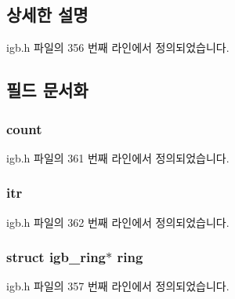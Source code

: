 \subsection{상세한 설명}


igb.\+h 파일의 356 번째 라인에서 정의되었습니다.



\subsection{필드 문서화}
\subsubsection[{\texorpdfstring{count}{count}}]{ count}\hypertarget{structigb__ring__container_a7906e924925f78f27079e8aed507dc09}{}\label{structigb__ring__container_a7906e924925f78f27079e8aed507dc09}


igb.\+h 파일의 361 번째 라인에서 정의되었습니다.

\subsubsection[{\texorpdfstring{itr}{itr}}]{ itr}\hypertarget{structigb__ring__container_ab2e0be8050c2da59d1821499950a92d7}{}\label{structigb__ring__container_ab2e0be8050c2da59d1821499950a92d7}


igb.\+h 파일의 362 번째 라인에서 정의되었습니다.

\subsubsection[{\texorpdfstring{ring}{ring}}]{\setlength{\rightskip}{0pt plus 5cm}struct {\bf igb\+\_\+ring}$\ast$ ring}\hypertarget{structigb__ring__container_a7ff435d2a0df26392bb30a9c2892c97b}{}\label{structigb__ring__container_a7ff435d2a0df26392bb30a9c2892c97b}


igb.\+h 파일의 357 번째 라인에서 정의되었습니다.

